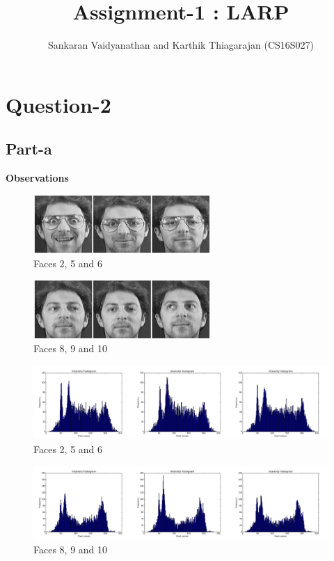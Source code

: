 \documentclass{article}
\title{Assignment-1 : LARP}
\author{Sankaran Vaidyanathan and Karthik Thiagarajan (CS16S027)}
\begin{document}
\maketitle

\tableofcontents

\newpage
\section{Question-2}

\subsection{Part-a}

\textbf{Observations}
\begin{figure}[h!]
	\centering
	\includegraphics[width=0.6\textwidth]{images/faces/face256}
	\caption{Faces 2, 5 and 6}
\end{figure}

\begin{figure}[h!]
	\centering
	\includegraphics[width=0.6\textwidth]{images/faces/face8910}
	\caption{Faces 8, 9 and 10}
\end{figure}

\begin{figure}[h!]
	\centering
	\includegraphics[width=\textwidth]{images/hists/face256}
	\caption{Faces 2, 5 and 6}
\end{figure}

\begin{figure}[h!]
	\centering
	\includegraphics[width=\textwidth]{images/hists/face8910}
	\caption{Faces 8, 9 and 10}
\end{figure}
\end{document}

